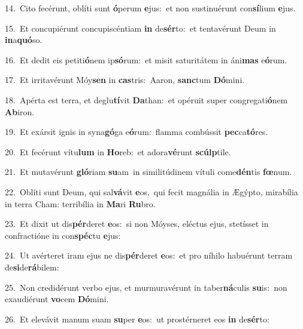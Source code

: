 {\numbfont\textcolor{\numbcolor}{14.}}~Cito fecérunt, oblíti sunt \textbf{ó}\-perum \textbf{e}\-jus:~\star et non sustinuérunt con\-\textbf{sí}\-lium \textbf{e}\-jus.\par
{\numbfont\textcolor{\numbcolor}{15.}}~Et concupiérunt concupiscéntiam \textbf{in} de\-\textbf{sér}\-to:~\star et tentavérunt Deum in \textbf{in}\-a\-\textbf{quó}\-so.\par
{\numbfont\textcolor{\numbcolor}{16.}}~Et dedit eis petiti\-\textbf{ó}\-nem ip\-\textbf{só}\-rum:~\star et misit saturitátem in áni\textbf{mas} e\-\textbf{ó}\-rum.\par
{\numbfont\textcolor{\numbcolor}{17.}}~Et irritavérunt Móy\textbf{sen} in \textbf{cas}\-tris:~\star Aaron, \textbf{sanc}\-tum \textbf{Dó}\-mini.\par
{\numbfont\textcolor{\numbcolor}{18.}}~Apérta est terra, et deglu\-\textbf{tí}\-vit \textbf{Da}\-than:~\star et opéruit super congregati\-\textbf{ó}\-nem \textbf{Ab}\-iron.\par
{\numbfont\textcolor{\numbcolor}{19.}}~Et exársit ignis in syna\-\textbf{gó}\-ga e\-\textbf{ó}\-rum:~\star flamma combússit \textbf{pec}\-ca\-\textbf{tó}\-res.\par
{\numbfont\textcolor{\numbcolor}{20.}}~Et fecérunt vítu\textbf{lum} in \textbf{Ho}\-reb:~\star et adora\-\textbf{vé}\-runt \textbf{scúlp}\-tile.\par
{\numbfont\textcolor{\numbcolor}{21.}}~Et mutavérunt \textbf{gló}\-riam \textbf{su}\-am~\star in similitúdinem vítuli come\-\textbf{dén}\-tis \textbf{fœ}\-num.\par
{\numbfont\textcolor{\numbcolor}{22.}}~Oblíti sunt Deum, qui sal\-\textbf{vá}\-vit \textbf{e}\-os,~\star qui fecit magnália in Ægýpto, mirabília in terra Cham: terribília in \textbf{Ma}\-ri \textbf{Ru}\-bro.\par
{\numbfont\textcolor{\numbcolor}{23.}}~Et dixit ut dis\-\textbf{pér}\-deret \textbf{e}\-os:~\star si non Móyses, eléctus ejus, stetísset in confractióne in con\-\textbf{spéc}\-tu \textbf{e}\-jus:\par
{\numbfont\textcolor{\numbcolor}{24.}}~Ut avérteret iram ejus ne dis\-\textbf{pér}\-deret \textbf{e}\-os:~\star et pro níhilo habuérunt terram de\-\textbf{si}\-de\-\textbf{rá}\-bilem:\par
{\numbfont\textcolor{\numbcolor}{25.}}~Non credidérunt verbo ejus, et murmuravérunt in taber\-\textbf{ná}\-culis \textbf{su}\-is:~\star non exaudiérunt \textbf{vo}\-cem \textbf{Dó}\-mini.\par
{\numbfont\textcolor{\numbcolor}{26.}}~Et elevávit manum suam \textbf{su}\-per \textbf{e}\-os:~\star ut prostérneret eos \textbf{in} de\-\textbf{sér}\-to:\par
